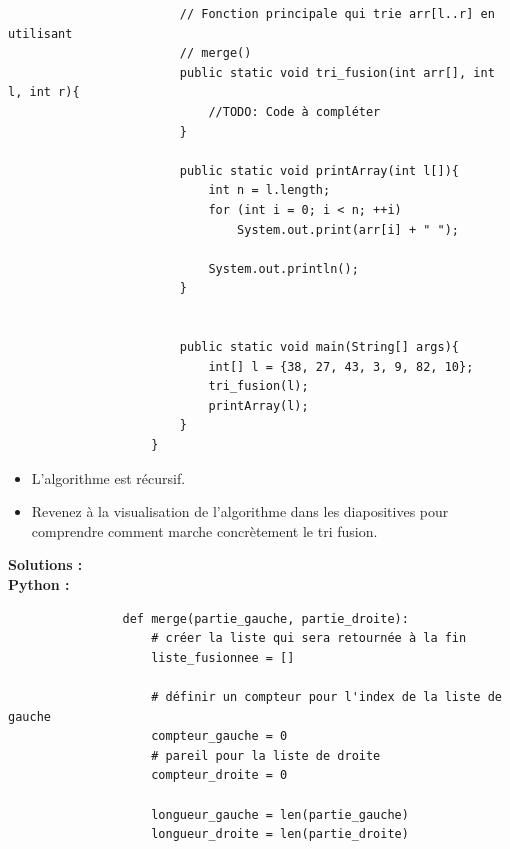\begin{Exercice} [30 minutes]
\begin{itemize}
\begin{verbatim}
                        // Fonction principale qui trie arr[l..r] en utilisant 
                        // merge() 
                        public static void tri_fusion(int arr[], int l, int r){
                            //TODO: Code à compléter 
                        }
                        
                        public static void printArray(int l[]){ 
                            int n = l.length; 
                            for (int i = 0; i < n; ++i) 
                                System.out.print(arr[i] + " "); 
                      
                            System.out.println(); 
                        } 
              
                        
                        public static void main(String[] args){
                            int[] l = {38, 27, 43, 3, 9, 82, 10};
                            tri_fusion(l);
                            printArray(l);
                        }
                    }
                \end{verbatim}
    \end{itemize}
    
    \begin{conseil}
    \begin{itemize}
        \item L'algorithme est récursif. 
        \item Revenez à la visualisation de l'algorithme dans les diapositives pour comprendre comment marche concrètement le tri fusion. 
    \end{itemize}
    
    \end{conseil}
    
    \textbf{Solutions :} \\
        \textbf{Python :}
            
            \begin{verbatim}
                def merge(partie_gauche, partie_droite):
                    # créer la liste qui sera retournée à la fin
                    liste_fusionnee = []   
                    
                    # définir un compteur pour l'index de la liste de gauche
                    compteur_gauche = 0   
                    # pareil pour la liste de droite
                    compteur_droite = 0   
                    
                    longueur_gauche = len(partie_gauche)  
                    longueur_droite = len(partie_droite) 
                    

\end{verbatim}
\end{Exercice}

